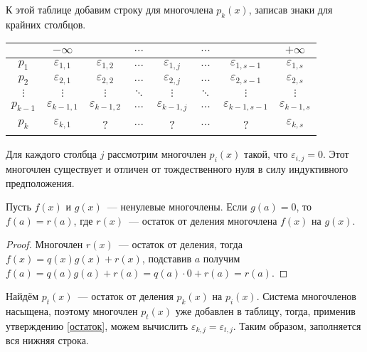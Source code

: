К этой таблице добавим строку для многочлена $p_{k}(x)$, записав знаки для крайних столбцов.
\begin{center}
    \begin{tabular}{ |c|c|c|c|c|c|c|c| } 
    \hline
        & $-\infty$ &  & $...$ &  & $...$ &  & $+\infty$ \\ 
    \hline
        $p_1$ & $\varepsilon_{1, 1}$ & $\varepsilon_{1, 2}$ & $...$ & $\varepsilon_{1, j}$ & $...$ & $\varepsilon_{1, s-1}$ & $\varepsilon_{1, s}$ \\ 
    \hline
        $p_2$ & $\varepsilon_{2, 1}$ & $\varepsilon_{2, 2}$ & $...$ & $\varepsilon_{2, j}$ & $...$ & $\varepsilon_{2, s-1}$ & $\varepsilon_{2, s}$ \\ 
    \hline
        $\vdots$ & $\vdots$ & $\vdots$ & $\ddots$ & $\vdots$ & $\ddots$ & $\vdots$ & $\vdots$ \\
    \hline
        $p_{k-1}$ & $\varepsilon_{k-1, 1}$ & $\varepsilon_{k-1, 2}$ & $...$ & $\varepsilon_{k-1, j}$ & $...$ & $\varepsilon_{k-1, s-1}$ & $\varepsilon_{k-1, s}$\\            
    \hline
        $p_{k}$ & $\varepsilon_{k, 1}$ & $ $?$ $  & $...$ & $ $?$ $ & $...$ & $ $?$ $  & $\varepsilon_{k, s}$\\    
    \hline
    \end{tabular}
\end{center}
Для каждого столбца $j$ рассмотрим многочлен $p_i(x)$ такой, что $\varepsilon_{i, j} = 0$. Этот многочлен существует и отличен от тождественного нуля в силу индуктивного предположения.
\begin{proposal}\label{остаток}
    Пусть $f(x)$ и $g(x)$~--- ненулевые многочлены. Если $g(a) = 0$, то $f(a) = r(a)$, где $r(x)$~--- остаток от деления многочлена $f(x)$ на $g(x)$.
\end{proposal}
\begin{proof}
    Многочлен $r(x)$~--- остаток от деления, тогда $f(x) = q(x)g(x) + r(x)$, подставив $a$ получим $f(a) = q(a)g(a) + r(a) = q(a)\cdot 0 + r(a) = r(a)$.
\end{proof}

Найдём $p_t(x)$~--- остаток от деления $p_k(x)$ на $p_i(x)$. Система многочленов насыщена, поэтому многочлен $p_t(x)$ уже добавлен в таблицу, тогда, применив утверждению \ref{остаток}, можем вычислить $\varepsilon_{k, j} = \varepsilon_{t, j}$. Таким образом, заполняется вся нижняя строка.

